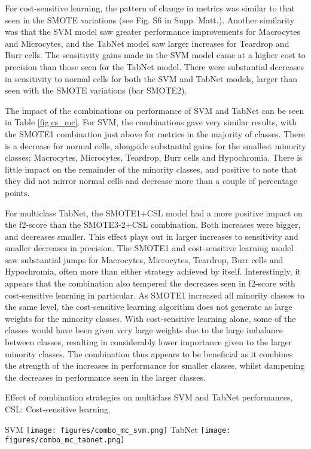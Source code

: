 \documentclass[final,5p,times,twocolumn,authoryear]{elsarticle}
\begin{document}
For cost-sensitive learning, the pattern of change in metrics was similar to that seen in the SMOTE variations (see Fig. S6 in Supp. Matt.). Another similarity was that the SVM model saw greater performance improvements for Macrocytes and Microcytes, and the TabNet model saw larger increases for Teardrop and Burr cells. The sensitivity gains made in the SVM model came at a higher cost to precision than those seen for the TabNet model. There were substantial decreases in sensitivity to normal cells for both the SVM and TabNet models, larger than seen with the SMOTE variations (bar SMOTE2).

The impact of the combinations on performance of SVM and TabNet can be seen in Table \ref{fig:cs_mc}. For SVM, the combinations gave very similar results, with the SMOTE1 combination just above for metrics in the majority of classes. There is a decrease for normal cells, alongside substantial gains for the smallest minority classes; Macrocytes, Microcytes, Teardrop, Burr cells and Hypochromia. There is little impact on the remainder of the minority classes, and positive to note that they did not mirror normal cells and decrease more than a couple of percentage points.

For multiclass TabNet, the SMOTE1+CSL model had a more positive impact on the f2-score than the SMOTE3-2+CSL combination. Both increases were bigger, and decreases smaller. This effect plays out in larger increases to sensitivity and smaller decreases in precision.
The SMOTE1 and cost-sensitive learning model saw substantial jumps for Macrocytes, Microcytes, Teardrop, Burr cells and Hypochromia, often more than either strategy achieved by itself. Interestingly, it appears that the combination also tempered the decreases seen in f2-score with cost-sensitive learning in particular. As SMOTE1 increased all minority classes to the same level, the cost-sensitive learning algorithm does not generate as large weights for the minority classes. With cost-sensitive learning alone, some of the classes would have been given very large weights due to the large imbalance between classes, resulting in considerably lower importance given to the larger minority classes. The combination thus appears to be beneficial as it combines the strength of the increases in performance for smaller classes, whilst dampening the decreases in performance seen in the larger classes.


\begin{table}[t!]
	\caption[CS mc combo]{Effect of combination strategies on multiclass SVM and TabNet performances, CSL: Cost-sensitive learning.}
	\centering
	{\footnotesize SVM }
	\texttt{[image: figures/combo\_mc\_svm.png]}
	{\footnotesize TabNet}
	\texttt{[image: figures/combo\_mc\_tabnet.png]}
	\label{fig:cs_mc}
\end{table}
\end{document}
